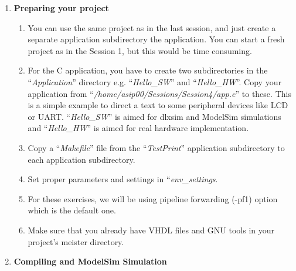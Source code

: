 \documentclass[
]{article}
\begin{document}
\begin{enumerate}
\def\labelenumi{\arabic{enumi}.}
\item
  \textbf{Preparing your project}

  \begin{enumerate}
  \def\labelenumii{\arabic{enumii}.}
  \item
    You can use the same project as in the last session, and just create
    a separate application subdirectory the application. You can start a
    fresh project as in the Session 1, but this would be time consuming.
  \item
    For the C application, you have to create two subdirectories in the
    ``\emph{Application}'' directory e.g. ``\emph{Hello\_SW}'' and
    ``\emph{Hello\_HW}''. Copy your application from
    ``\emph{/home/asip00/Sessions/Session4/app.c}'' to these. This is a
    simple example to direct a text to some peripheral devices like LCD
    or UART. ``\emph{Hello\_SW}'' is aimed for dlxsim and ModelSim
    simulations and ``\emph{Hello\_HW}'' is aimed for real hardware
    implementation.
  \item
    Copy a ``\emph{Makefile}'' file from the ``\emph{TestPrint}''
    application subdirectory to each application subdirectory.
  \item
    Set proper parameters and settings in ``\emph{env\_settings}.
  \item
    For these exercises, we will be using pipeline forwarding (-pf1)
    option which is the default one.
  \item
    Make sure that you already have VHDL files and GNU tools in your
    project's meister directory.
  \end{enumerate}
\item
  \textbf{Compiling and ModelSim Simulation}


\end{enumerate}
\end{document}
